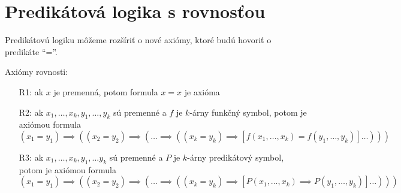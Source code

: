 \section{Predikátová logika s rovnosťou}

Predikátovú logiku môžeme rozšíriť o nové axiómy, ktoré budú
hovoriť o predikáte ``=''.

\par{Axiómy rovnosti:}
\noindent
\begin{itemize}
    \item[R1:] ak $x$ je premenná, potom formula $x=x$ je axióma
    \item[R2:] ak $x_1,\dots,x_k, y_1, \dots, y_k$ sú premenné a 
        $f$ je $k$-árny funkčný symbol, potom je axiómou formula
        \begin{equation*}
            (x_1 = y_1) \implies ( (x_2 = y_2) \implies ( \dots
                \implies ((x_k = y_k) \implies
                    [f(x_1,\dots,x_k) = f(y_1,\dots,y_k)] \dots )))
        \end{equation*}
    \item[R3:] ak $x_1,\dots,x_k, y_1, \dots y_k$ sú premenné a 
        $P$ je $k$-árny predikátový symbol, potom je axiómou formula
        \begin{equation*}
            (x_1 = y_1) \implies ( (x_2 = y_2) \implies ( \dots
                \implies ((x_k = y_k) \implies
                    [P(x_1,\dots,x_k) \implies P(y_1,\dots,y_k)] \dots )))
        \end{equation*}
\end{itemize}

